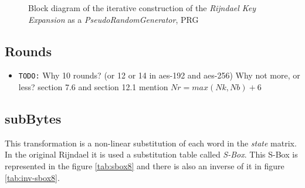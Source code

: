 \documentclass[10pt,a4paper,twoside]{llncs}
\begin{document}
\begin{figure}
\begin{center}
\begin{tikzpicture}[>=latex]
\end{tikzpicture}
\caption{Block diagram of the iterative construction of the \emph{Rijndael Key Expansion} as a \emph{PseudoRandomGenerator}, PRG}
\label{fig:keyExpansionDiagram}
\end{center}
\end{figure}

\subsection{Rounds}\label{sec:rounds}
\begin{itemize}
 \item \texttt{TODO:} Why 10 rounds? (or 12 or 14 in aes-192 and aes-256) Why not more, or less? \cite{Daemen01aes-ammended} section 7.6 and section 12.1 mention $Nr = max(Nk,Nb)+6$
\end{itemize}


\subsection{subBytes}\label{sec:subBytes}
This transformation is a non-linear substitution of each word in the \emph{state} matrix. In the original Rijndael it is used a substitution table called \emph{S-Box}. This S-Box is represented in the figure \ref{tab:sbox8} and there is also an inverse of it in figure \ref{tab:inv-sbox8}.
\end{document}
